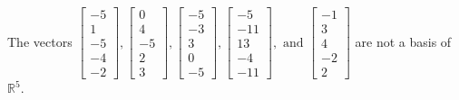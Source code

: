 \begin{exercise}
\begin{exerciseStatement}
  \end{exerciseStatement}
  \begin{exerciseAnswer}
   The vectors \(\left[\begin{array}{r}
-5 \\
1 \\
-5 \\
-4 \\
-2
\end{array}\right] , \left[\begin{array}{r}
0 \\
4 \\
-5 \\
2 \\
3
\end{array}\right] , \left[\begin{array}{r}
-5 \\
-3 \\
3 \\
0 \\
-5
\end{array}\right] , \left[\begin{array}{r}
-5 \\
-11 \\
13 \\
-4 \\
-11
\end{array}\right] , \text{ and } \left[\begin{array}{r}
-1 \\
3 \\
4 \\
-2 \\
2
\end{array}\right]\) 
  	 are not  a basis of \(\mathbb{R}^5\).
  


  \end{exerciseAnswer}
\end{exercise}